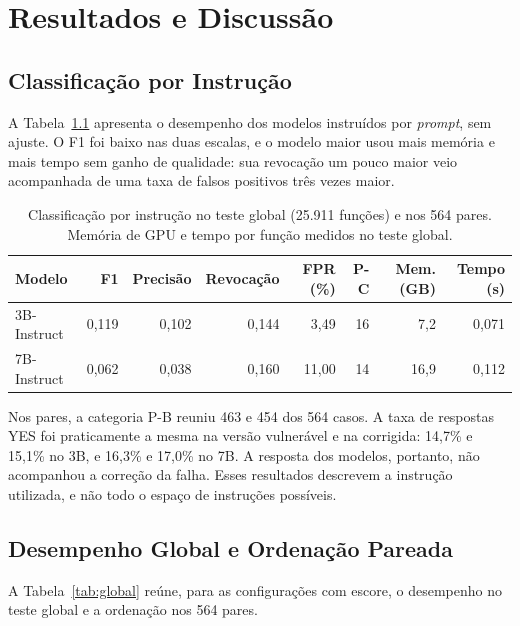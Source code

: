 \chapter{Resultados e Discussão}

\section{Classificação por Instrução}

A Tabela~\ref{tab:instrucao} apresenta o desempenho dos modelos instruídos por \textit{prompt}, sem ajuste. O F1 foi baixo nas duas escalas, e o modelo maior usou mais memória e mais tempo sem ganho de qualidade: sua revocação um pouco maior veio acompanhada de uma taxa de falsos positivos três vezes maior.

\begin{table}[H]
    \centering
    \caption{Classificação por instrução no teste global (25.911 funções) e nos 564 pares. Memória de GPU e tempo por função medidos no teste global.}
    \label{tab:instrucao}
    \footnotesize
    \begin{tabular}{lrrrrrrr}
        \toprule
        \textbf{Modelo} & \textbf{F1} & \textbf{Precisão} & \textbf{Revocação} & \textbf{FPR (\%)} & \textbf{P-C} & \textbf{Mem. (GB)} & \textbf{Tempo (s)} \\
        \midrule
        3B-Instruct & 0,119 & 0,102 & 0,144 & 3,49 & 16 & 7,2 & 0,071 \\
        7B-Instruct & 0,062 & 0,038 & 0,160 & 11,00 & 14 & 16,9 & 0,112 \\
        \bottomrule
    \end{tabular}
\end{table}

Nos pares, a categoria P-B reuniu 463 e 454 dos 564 casos. A taxa de respostas YES foi praticamente a mesma na versão vulnerável e na corrigida: 14,7\% e 15,1\% no 3B, e 16,3\% e 17,0\% no 7B. A resposta dos modelos, portanto, não acompanhou a correção da falha. Esses resultados descrevem a instrução utilizada, e não todo o espaço de instruções possíveis.

\section{Desempenho Global e Ordenação Pareada}

A Tabela~\ref{tab:global} reúne, para as configurações com escore, o desempenho no teste global e a ordenação nos 564 pares.

